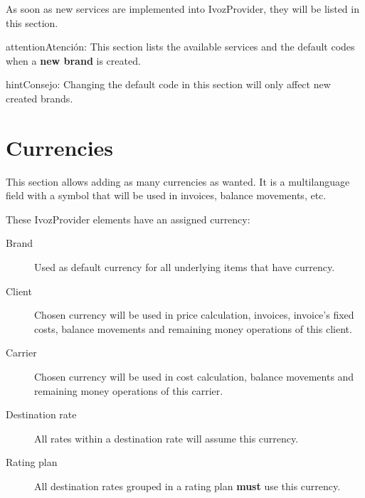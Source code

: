 \documentclass[letterpaper,10pt,spanish]{sphinxmanual}
\begin{document}
As soon as new services are implemented into IvozProvider, they will be listed
in this section.

\begin{notice}{attention}{Atención:}
This section lists the available services and the default codes
when a \textbf{new brand} is created.
\end{notice}

\begin{notice}{hint}{Consejo:}
Changing the default code in this section will only affect new
created brands.
\end{notice}


\section{Currencies}
\label{administration_portal/platform/currencies:currencies}\label{administration_portal/platform/currencies::doc}
This section allows adding as many currencies as wanted. It is a multilanguage field with a symbol that will be used
in invoices, balance movements, etc.

These IvozProvider elements have an assigned currency:
\begin{description}
\item[{Brand}] \leavevmode{}\label{administration_portal/platform/currencies:term-brand}
Used as default currency for all underlying items that have currency.

\item[{Client}] \leavevmode{}\label{administration_portal/platform/currencies:term-client}
Chosen currency will be used in price calculation, invoices, invoice's fixed costs, balance movements and
remaining money operations of this client.

\item[{Carrier}] \leavevmode{}\label{administration_portal/platform/currencies:term-carrier}
Chosen currency will be used in cost calculation, balance movements and
remaining money operations of this carrier.

\item[{Destination rate}] \leavevmode{}\label{administration_portal/platform/currencies:term-destination-rate}
All rates within a destination rate will assume this currency.

\item[{Rating plan}] \leavevmode{}\label{administration_portal/platform/currencies:term-rating-plan}
All destination rates grouped in a rating plan \textbf{must} use this currency.

\end{description}
\end{document}
